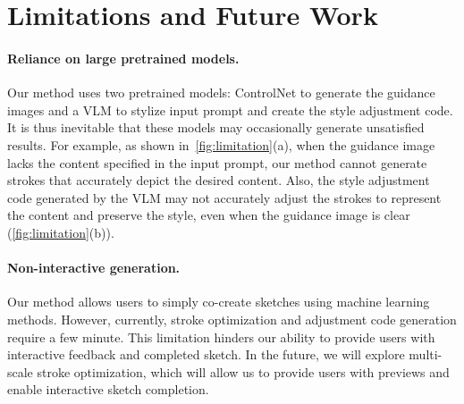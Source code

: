\section{Limitations and Future Work}

\paragraph{Reliance on large pretrained models.}
Our method uses two pretrained models: ControlNet to generate the guidance images and a VLM to stylize input prompt and create the style adjustment code.
It is thus inevitable that these models may occasionally generate unsatisfied results.
For example, as shown in~\cref{fig:limitation}(a), when the guidance image lacks the content specified in the input prompt, our method cannot generate strokes that accurately depict the desired content.
Also, the style adjustment code generated by the VLM may not accurately adjust the strokes to represent the content and preserve the style, even when the guidance image is clear (\cref{fig:limitation}(b)).

\paragraph{Non-interactive generation.}
Our method allows users to simply co-create sketches using machine learning methods.
However, currently, stroke optimization and adjustment code generation require a few minute.
This limitation hinders our ability to provide users with interactive feedback and completed sketch.
In the future, we will explore multi-scale stroke optimization, which will allow us to provide users with previews and enable interactive sketch completion.
